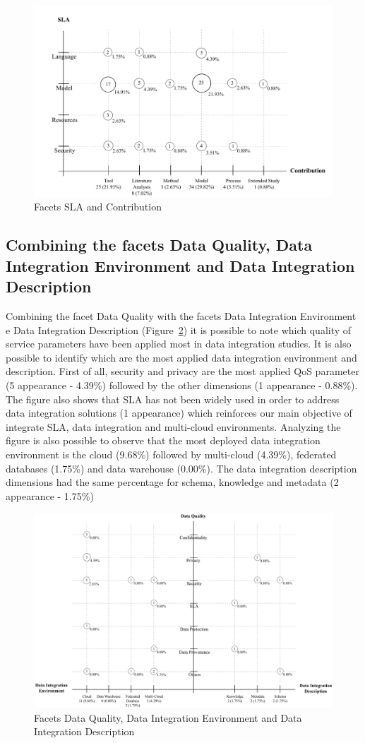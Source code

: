 \begin{figure}[h!]
\centering
\includegraphics[scale=0.5]{figs/bubble-charts/SLA-Contribution.pdf}
\caption{Facets SLA and Contribution}\label{fig:facet3}
\end{figure}


\subsection{Combining the facets Data Quality, Data Integration Environment and Data Integration Description}

Combining the facet Data Quality with the facets Data Integration Environment e Data Integration Description
(Figure~\ref{fig:facet4}) it is possible to note which quality of service parameters have been applied most in
data integration studies.
It is also possible to identify which are the most applied data integration environment and description.
First of all, security and privacy are the most applied QoS parameter (5 appearance - 4.39\%)
followed by the other dimensions (1 appearance - 0.88\%). 
The figure also shows that SLA has not been widely used in order to address data integration solutions
(1 appearance) which reinforces our main objective of integrate SLA, data integration and multi-cloud 
environments. 
Analyzing the figure is also possible to observe that the most deployed data integration environment is 
the cloud (9.68\%) followed by multi-cloud (4.39\%), federated databases (1.75\%) and data warehouse (0.00\%).
The data integration description dimensions had the same percentage for schema, knowledge and metadata (2 appearance - 1.75\%)

\begin{figure}[h!]
\centering
\includegraphics[scale=0.53]{figs/bubble-charts/Data-Quality-DI.pdf}
\caption{Facets Data Quality, Data Integration Environment and Data Integration Description}\label{fig:facet4}
\end{figure}
